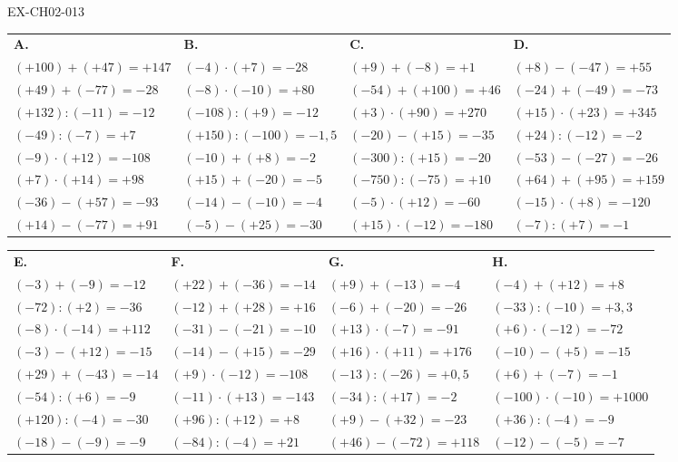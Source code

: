 \documentclass[12pt, a4paper]{article}
\begin{document}
\begin{solution}{EX-CH02-013}

\def\arraystretch{1.7}
\begin{tabularx}{\linewidth}{*{4}{X}}
\textbf{A.} & \textbf{B.} & \textbf{C.} & \textbf{D.} \\
$(+100)+(+47)=+147$ & $(-4)\cdot(+7)=-28$    & $(+9)+(-8)=+1$       & $(+8)-(-47)=+55$      \\
$(+49)+(-77)=-28$   & $(-8)\cdot(-10)=+80$   & $(-54)+(+100)=+46$   & $(-24)+(-49)=-73$     \\
$(+132):(-11)=-12$  & $(-108):(+9)=-12$      & $(+3)\cdot(+90)=+270$& $(+15)\cdot(+23)=+345$\\
$(-49):(-7)=+7$     & $(+150):(-100)=-1{,}5$ & $(-20)-(+15)=-35$    & $(+24):(-12)=-2$      \\
$(-9)\cdot(+12)=-108$ & $(-10)+(+8)=-2$      & $(-300):(+15)=-20$   & $(-53)-(-27)=-26$     \\
$(+7)\cdot(+14)=+98$& $(+15)+(-20)=-5$       & $(-750):(-75)=+10$   & $(+64)+(+95)=+159$    \\
$(-36)-(+57)=-93$   & $(-14)-(-10)=-4$       & $(-5)\cdot(+12)=-60$ & $(-15)\cdot(+8)=-120$ \\
$(+14)-(-77)=+91$   & $(-5)-(+25)=-30$       & $(+15)\cdot(-12)=-180$& $(-7):(+7)=-1$       \\
\end{tabularx}

\bigskip
\begin{tabularx}{\linewidth}{*{4}{X}}
\textbf{E.} & \textbf{F.} & \textbf{G.} & \textbf{H.} \\
$(-3)+(-9)=-12$      & $(+22)+(-36)=-14$     & $(+9)+(-13)=-4$      & $(-4)+(+12)=+8$       \\
$(-72):(+2)=-36$     & $(-12)+(+28)=+16$     & $(-6)+(-20)=-26$     & $(-33):(-10)=+3{,}3$  \\
$(-8)\cdot(-14)=+112$& $(-31)-(-21)=-10$     & $(+13)\cdot(-7)=-91$ & $(+6)\cdot(-12)=-72$  \\
$(-3)-(+12)=-15$     & $(-14)-(+15)=-29$     & $(+16)\cdot(+11)=+176$& $(-10)-(+5)=-15$     \\
$(+29)+(-43)=-14$    & $(+9)\cdot(-12)=-108$ & $(-13):(-26)=+0{,}5$ & $(+6)+(-7)=-1$        \\
$(-54):(+6)=-9$      & $(-11)\cdot(+13)=-143$& $(-34):(+17)=-2$     & $(-100)\cdot(-10)=+1000$ \\
$(+120):(-4)=-30$    & $(+96):(+12)=+8$      & $(+9)-(+32)=-23$     & $(+36):(-4)=-9$       \\
$(-18)-(-9)=-9$      & $(-84):(-4)=+21$      & $(+46)-(-72)=+118$   & $(-12)-(-5)=-7$       \\
\end{tabularx}


\end{solution}
\end{document}
